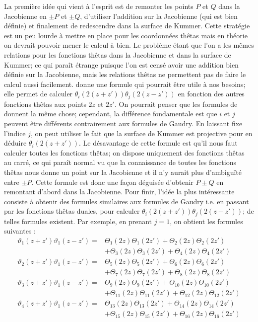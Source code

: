 \documentclass[a4paper]{article}
\theoremstyle{definition}
\theoremstyle{remark}
\numberwithin{equation}{section}
\begin{document}
La première idée qui vient à l'esprit est de remonter les points $P$ et $Q$ dans la Jacobienne en $\pm P$ et $\pm Q$, d'utiliser l'addition sur la Jacobienne (qui est bien définie) et finalement de redescendre dans la surface de Kummer. Cette stratégie est un peu lourde à mettre en place pour les coordonnées thêtas mais en théorie on devrait pouvoir mener le calcul à bien. Le problème étant que l'on a les mêmes relations pour les fonctions thêtas dans la Jacobienne et dans la surface de Kummer; ce qui paraît étrange puisque l'on est censé avoir une addition bien définie sur la Jacobienne, mais les relations thêtas ne permettent pas de faire le calcul aussi facilement. \citet{cosset} donne une formule qui pourrait être utile à nos besoins; elle permet de calculer $\theta_i(2(z+z'))\theta_j(2(z-z'))$ en fonction des autres fonctions thêtas aux points $2z$ et $2z'$. On pourrait penser que les formules de \citet{gaudry} donnent la même chose; cependant, la différence fondamentale est que $i$ et $j$ peuvent être différents contrairement aux formules de Gaudry. En laissant fixe l'indice $j$, on peut utiliser le fait que la surface de Kummer est projective pour en déduire $\theta_i(2(z+z'))$. Le désavantage de cette formule est qu'il nous faut calculer toutes les fonctions thêtas; on dispose uniquement des fonctions thêtas au carré, ce qui paraît normal vu que la connaissance de toutes les fonctions thêtas nous donne un point sur la Jacobienne et il n'y aurait plus d'ambiguïté entre $\pm P$. Cette formule est donc une façon déguisée d'obtenir $P \pm Q$ en remontant d'abord dans la Jacobienne. Pour finir, l'idée la plus intéressante consiste à obtenir des formules similaires aux formules de Gaudry i.e. en passant par les fonctions thêtas duales, pour calculer $\theta_i(2(z+z'))\theta_j(2(z-z'))$; de telles formules existent. Par exemple, en prenant $j=1$, on obtient les formules suivantes :
\[
\begin{aligned}
\vartheta_1(z+z')\vartheta_1(z-z') ={}& \Theta_1(2z)\Theta_1(2z') + \Theta_2(2z)\Theta_2(2z')\\
 &+ \Theta_3(2z)\Theta_3(2z') + \Theta_4(2z)\Theta_4(2z') \\
\vartheta_2(z+z')\vartheta_1(z-z') ={}& \Theta_5(2z)\Theta_5(2z') + \Theta_6(2z)\Theta_6(2z') \\
 &+ \Theta_7(2z)\Theta_7(2z') + \Theta_8(2z)\Theta_8(2z') \\
\vartheta_3(z+z')\vartheta_1(z-z') ={}& \Theta_9(2z)\Theta_9(2z') + \Theta_{10}(2z)\Theta_{10}(2z') \\
 &+ \Theta_{11}(2z)\Theta_{11}(2z') + \Theta_{12}(2z)\Theta_{12}(2z') \\
\vartheta_4(z+z')\vartheta_1(z-z') ={}& \Theta_{13}(2z)\Theta_{13}(2z') + \Theta_{14}(2z)\Theta_{14}(2z') \\
 &+ \Theta_{15}(2z)\Theta_{15}(2z') + \Theta_{16}(2z)\Theta_{16}(2z') \\
\end{aligned}
\]
\end{document}

